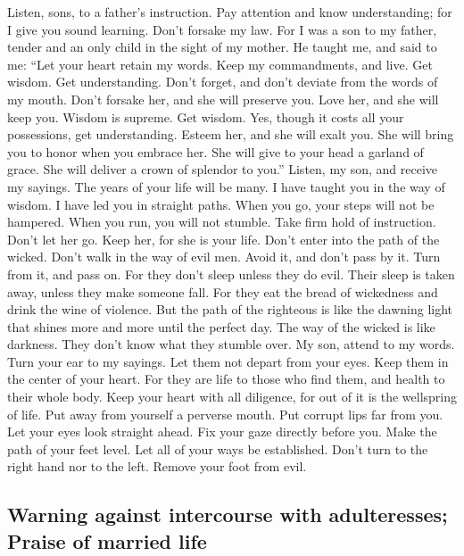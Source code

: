  Listen, sons, to a father's instruction. Pay attention
and know understanding;  for I give you sound learning.
Don't forsake my law.  For I was a son to my father,
tender and an only child in the sight of my mother.  He
taught me, and said to me: ``Let your heart retain my words. Keep my
commandments, and live.  Get wisdom. Get understanding.
Don't forget, and don't deviate from the words of my mouth.
 Don't forsake her, and she will preserve you. Love her,
and she will keep you.  Wisdom is supreme. Get wisdom.
Yes, though it costs all your possessions, get understanding.
 Esteem her, and she will exalt you. She will bring you to
honor when you embrace her.  She will give to your head a
garland of grace. She will deliver a crown of splendor to you.''
 Listen, my son, and receive my sayings. The years of
your life will be many.  I have taught you in the way of
wisdom. I have led you in straight paths.  When you go,
your steps will not be hampered. When you run, you will not stumble.
 Take firm hold of instruction. Don't let her go. Keep
her, for she is your life.  Don't enter into the path of
the wicked. Don't walk in the way of evil men.  Avoid it,
and don't pass by it. Turn from it, and pass on.  For
they don't sleep unless they do evil. Their sleep is taken away, unless
they make someone fall.  For they eat the bread of
wickedness and drink the wine of violence.  But the path
of the righteous is like the dawning light that shines more and more
until the perfect day.  The way of the wicked is like
darkness. They don't know what they stumble over.  My
son, attend to my words. Turn your ear to my sayings. 
Let them not depart from your eyes. Keep them in the center of your
heart.  For they are life to those who find them, and
health to their whole body.  Keep your heart with all
diligence, for out of it is the wellspring of life.  Put
away from yourself a perverse mouth. Put corrupt lips far from you.
 Let your eyes look straight ahead. Fix your gaze
directly before you.  Make the path of your feet level.
Let all of your ways be established.  Don't turn to the
right hand nor to the left. Remove your foot from evil.

\hypertarget{warning-against-intercourse-with-adulteresses-praise-of-married-life}{%
\subsection{Warning against intercourse with adulteresses; Praise of
married
life}\label{warning-against-intercourse-with-adulteresses-praise-of-married-life}}

